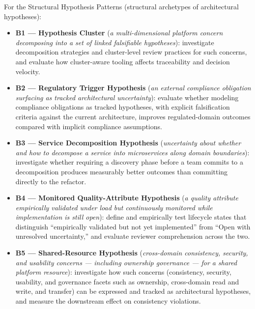 For the Structural Hypothesis Patterns (structural archetypes of architectural hypotheses):

\begin{itemize}
  \item \textbf{B1 --- Hypothesis Cluster}
    (\emph{a multi-dimensional platform concern decomposing into a set of
    linked falsifiable hypotheses}): investigate decomposition strategies and
    cluster-level review practices for such concerns, and evaluate how
    cluster-aware tooling affects traceability and decision velocity.
  \item \textbf{B2 --- Regulatory Trigger Hypothesis}
    (\emph{an external compliance obligation surfacing as tracked
    architectural uncertainty}): evaluate whether modeling compliance
    obligations as tracked hypotheses, with explicit falsification criteria
    against the current architecture, improves regulated-domain outcomes
    compared with implicit compliance assumptions.
  \item \textbf{B3 --- Service Decomposition Hypothesis}
    (\emph{uncertainty about whether and how to decompose a service into
    microservices along domain boundaries}): investigate whether requiring a discovery phase before a team
    commits to a decomposition produces measurably better outcomes than committing
    directly to the refactor.
  \item \textbf{B4 --- Monitored Quality-Attribute Hypothesis}
    (\emph{a quality attribute empirically validated under load but continuously
    monitored while implementation is still open}): define and empirically test lifecycle states that
    distinguish ``empirically validated but not yet implemented'' from
    ``Open with unresolved uncertainty,'' and evaluate reviewer comprehension
    across the two.
  \item \textbf{B5 --- Shared-Resource Hypothesis}
    (\emph{cross-domain consistency, security, and usability concerns ---
    including ownership governance --- for a shared platform
    resource}): investigate how such concerns (consistency, security,
    usability, and governance facets such as ownership,
    cross-domain read and write, and transfer) can be expressed and tracked as
    architectural hypotheses, and measure the downstream effect on
    consistency violations.
\end{itemize}
